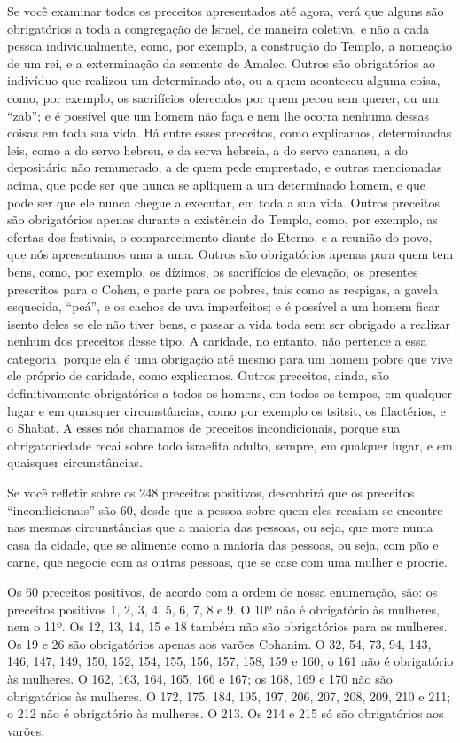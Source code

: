 Se você examinar todos os preceitos apresentados até agora, verá que
alguns são obrigatórios a toda a congregação de Israel, de maneira
coletiva, e não a cada pessoa individualmente, como, por exemplo, a
construção do Templo, a nomeação de um rei, e a exterminação da semente
de Amalec. Outros são obrigatórios ao indivíduo que realizou um
determinado ato, ou a quem aconteceu alguma coisa, como, por exemplo,
os sacrifícios oferecidos por quem pecou sem querer, ou um ``zab''; e é
possível que um homem não faça e nem lhe ocorra nenhuma dessas coisas em
toda sua vida. Há entre esses preceitos, como explicamos, determinadas
leis, como a do servo hebreu, e da serva hebreia, a do servo cananeu, a
do depositário não remunerado, a de quem pede emprestado, e outras
mencionadas acima, que pode ser que nunca se apliquem a um determinado
homem, e que pode ser que ele nunca chegue a executar, em toda a sua
vida. Outros preceitos são obrigatórios apenas durante a existência do
Templo, como, por exemplo, as ofertas dos festivais, o comparecimento
diante do Eterno, e a reunião do povo, que nós apresentamos uma a uma.
Outros são obrigatórios apenas para quem tem bens, como, por exemplo,
os dízimos, os sacrifícios de elevação, os presentes prescritos para o
Cohen, e parte para os pobres, tais como as respigas, a gavela
esquecida, ``peá'', e os cachos de uva imperfeitos; e é possível a um
homem ficar isento deles se ele não tiver bens, e passar a vida toda sem
ser obrigado a realizar nenhum dos preceitos desse tipo. A caridade, no
entanto, não pertence a essa categoria, porque ela é uma obrigação até
mesmo para um homem pobre que vive ele próprio de caridade, como
explicamos. Outros preceitos, ainda, são definitivamente obrigatórios a todos os homens, em todos os tempos, em qualquer lugar e em
quaisquer circunstâncias, como por exemplo os tsitsit, os
filactérios, e o Shabat. A esses nós chamamos de preceitos
incondicionais, porque sua obrigatoriedade recai sobre todo israelita
adulto, sempre, em qualquer lugar, e em quaisquer circunstâncias.

Se você refletir sobre os 248 preceitos positivos, descobrirá que os
preceitos ``incondicionais'' são 60, desde que a pessoa sobre quem eles
recaiam se encontre nas mesmas circunstâncias que a maioria das pessoas,
ou seja, que more numa casa da cidade, que se alimente como a maioria
das pessoas, ou seja, com pão e carne, que negocie com as outras
pessoas, que se case com uma mulher e procrie.

Os 60 preceitos positivos, de acordo com a ordem de nossa enumeração,
são: os preceitos positivos 1, 2, 3, 4, 5, 6, 7, 8 e 9. O 10º não é
obrigatório às mulheres, nem o 11º. Os 12, 13, 14, 15 e 18 também não
são obrigatórios para as mulheres. Os 19 e 26 são obrigatórios apenas
aos varões Cohanim. O 32, 54, 73, 94, 143, 146, 147, 149, 150, 152,
154, 155, 156, 157, 158, 159 e 160; o 161 não é obrigatório às mulheres.
O 162, 163, 164, 165, 166 e 167; os 168, 169 e 170 não são obrigatórios
às mulheres. O 172, 175, 184, 195, 197, 206, 207, 208, 209, 210 e 211; o
212 não é obrigatório às mulheres. O 213. Os 214 e 215 só são
obrigatórios aos varões.

